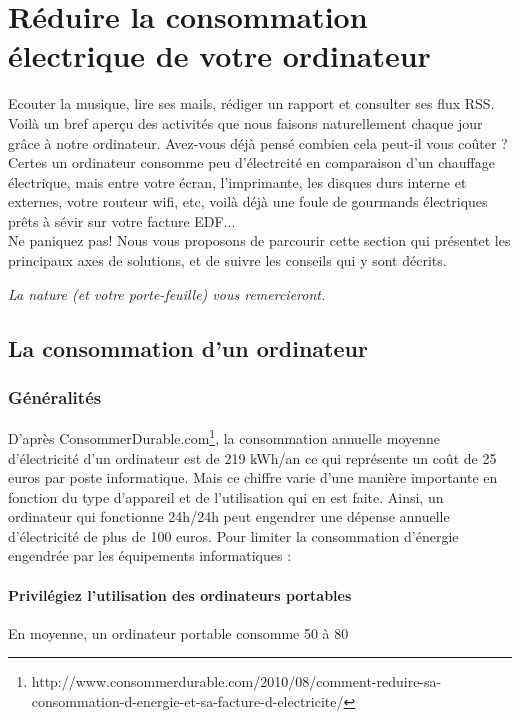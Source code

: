 \documentclass[a4paper,11pt,french]{article}
\begin{document}
\section[Réduire sa consommation]{Réduire la consommation électrique de votre ordinateur}

Ecouter la musique, lire ses mails, rédiger un rapport et consulter ses flux RSS. Voilà un bref aperçu des activités que nous faisons naturellement chaque jour grâce à notre ordinateur. Avez-vous déjà pensé combien cela peut-il vous coûter ?
Certes un ordinateur consomme peu d'électrcité en comparaison d'un chauffage électrique, mais entre votre écran, l'imprimante, les disques durs interne et externes, votre routeur wifi, etc, voilà déjà une foule de gourmands électriques prêts à sévir sur votre facture EDF...\\

Ne paniquez pas! Nous vous proposons de parcourir cette section qui présentet les principaux axes de solutions, et de suivre les conseils qui y sont décrits.\\
\begin{center}
\emph{La nature (et votre porte-feuille) vous remercieront.}
\end{center}

\subsection{La consommation d'un ordinateur}

\subsubsection{Généralités}
D'après ConsommerDurable.com\footnote{\textsf{http://www.consommerdurable.com/2010/08/comment-reduire-sa-consommation-d-energie-et-sa-facture-d-electricite/}}, la consommation annuelle moyenne d’électricité d’un ordinateur est de 219 kWh/an ce qui représente un coût de 25 euros par poste informatique. Mais ce chiffre varie d’une manière importante en fonction du type d’appareil et de l’utilisation qui en est faite. Ainsi, un ordinateur qui fonctionne 24h/24h peut engendrer une dépense annuelle d’électricité de plus de 100 euros. Pour limiter la consommation d’énergie engendrée par les équipements informatiques :

\paragraph{Privilégiez l’utilisation des ordinateurs portables}
En moyenne, un ordinateur portable consomme 50 à 80%
\end{document}
